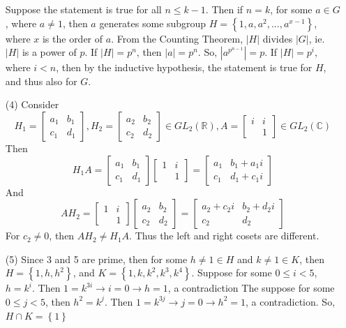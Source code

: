\documentclass[12pt]{article}
\begin{document}
\begin{itemize}
Suppose the statement is true for all $n \leq k - 1$. Then if $n = k$, for some $a \in G$, where $a \neq 1$, then $a$ generates some subgroup $H = \left\lbrace 1, a, a^2, ..., a^{x - 1} \right\rbrace$, where $x$ is the order of $a$. From the Counting Theorem, $|H|$ divides $|G|$, ie. $|H|$ is a power of $p$. If $|H| = p^n$, then $|a| = p^n$. So, $|a^{p^{n-1}}| = p$. If $|H| = p^i$, where $i < n$, then by the inductive hypothesis, the statement is true for $H$, and thus also for $G$.
\item[(4)]
Consider
$$H_1 = \begin{bmatrix}
a_1 & b_1 \\
c_1 & d_1
\end{bmatrix}, H_2 = \begin{bmatrix}
a_2 & b_2 \\
c_2 & d_2
\end{bmatrix} \in GL_2(\mathbb{R}), A = \begin{bmatrix}
i & i \\
& 1
\end{bmatrix} \in GL_2(\mathbb{C})$$
Then
$$H_1A = \begin{bmatrix}
a_1 & b_1 \\
c_1 & d_1
\end{bmatrix}\begin{bmatrix}
1 & i \\
& 1
\end{bmatrix} = \begin{bmatrix}
a_1 & b_1 + a_1i \\
c_1 & d_1 + c_1i
\end{bmatrix}$$
And
$$AH_2 = \begin{bmatrix}
1 & i \\
& 1
\end{bmatrix}\begin{bmatrix}
a_2 & b_2 \\
c_2 & d_2
\end{bmatrix} = \begin{bmatrix}
a_2 + c_2i & b_2 + d_2i \\
c_2 & d_2
\end{bmatrix}$$
For $c_2 \neq 0$, then $AH_2 \neq H_1A$. Thus the left and right cosets are different.
\item[(5)]
Since 3 and 5 are prime, then for some $h \neq 1 \in H$ and $k \neq 1 \in K$, then $H = \left\lbrace 1, h, h^2 \right\rbrace$, and $K = \left\lbrace 1, k, k^2, k^3, k^4 \right\rbrace$. Suppose for some $0 \leq i < 5$, $h = k^i$. Then $1 = k^{3i} \rightarrow i = 0 \rightarrow h = 1$, a contradiction The suppose for some $0 \leq j < 5$, then $h^2 = k^j$. Then $1 = k^{3j} \rightarrow j = 0 \rightarrow h^2 = 1$, a contradiction. So, $H \cap K = \left\lbrace 1 \right\rbrace$

\end{itemize}
\end{document}
